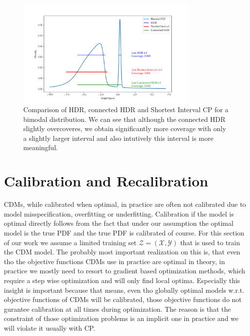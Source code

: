 \begin{figure}
    \centering
    \includegraphics[width=0.8\textwidth]{resources/bimodal_distribution_hdr_vs_shortest_interval.png}
    \caption[Comparison of HDR, connected HDR and Shortest Interval CP]{Comparison of HDR, connected HDR and Shortest Interval CP for a bimodal distribution. We can see that although the connected HDR slightly overcoveres, we obtain significantly more coverage with only a slightly larger interval and also intutively this interval is more meaningful.}
    \label{fig:hdr_vs_shortest_intervals}
\end{figure}


\section{Calibration and Recalibration}\label{sec:calibration}

CDMs, while calibrated when optimal, in practice are often not calibrated due to model misspecification, overfitting or underfitting. Calibration if the model is optimal directly follows from the fact that under our assumption the optimal model is the true PDF and the true PDF is calibrated of course. For this section of our work we assume a limited training set $\mathcal{Z} = (\mathcal{X}, \mathcal{Y})$ that is used to train the CDM model. The probably most important realization on this is, that even tho the objective functions CDMs use in practice are optimal in theory, in practice we mostly need to resort to gradient based optimization methods, which require a step wise optimization and will only find local optima. Especially this insight is important because that means, even tho globally optimal models w.r.t. objective functions of CDMs will be calibrated, those objective functions do not gurantee calibration at all times during optimization. The reason is that the constraint of those optimization problems is an implicit one in practice and we will violate it usually with CP.

